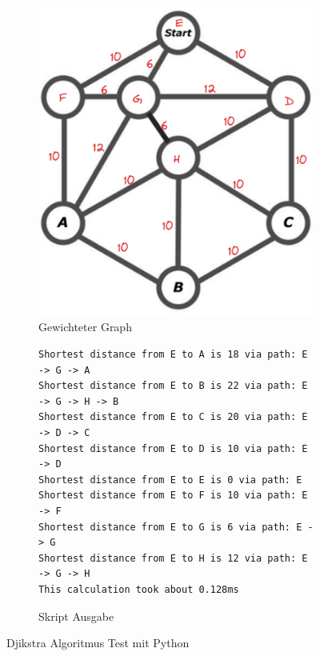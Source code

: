 \begin{figure}[H]
\begin{subfigure}{0.275\textwidth}
\includegraphics[width=0.95\linewidth]{img/graph_with_weighted_edges.png} 
\caption{Gewichteter Graph}
\label{fig:weighted-graph}
\end{subfigure}
\begin{subfigure}{0.720\textwidth}
\begin{footnotesize}
\begin{verbatim}
Shortest distance from E to A is 18 via path: E -> G -> A
Shortest distance from E to B is 22 via path: E -> G -> H -> B
Shortest distance from E to C is 20 via path: E -> D -> C
Shortest distance from E to D is 10 via path: E -> D
Shortest distance from E to E is 0 via path: E
Shortest distance from E to F is 10 via path: E -> F
Shortest distance from E to G is 6 via path: E -> G
Shortest distance from E to H is 12 via path: E -> G -> H
This calculation took about 0.128ms
\end{verbatim}
\end{footnotesize}
\caption{Skript Ausgabe}
\label{fig:djikstra-test-skript-output}
\end{subfigure}

\caption{Djikstra Algoritmus Test mit Python}
\label{fig:image2}
\end{figure}

